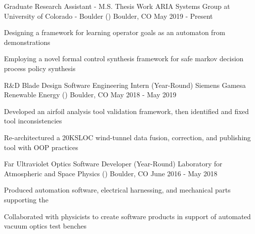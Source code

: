\begin{cventries}
  \cventry
    {Graduate Research Assistant - M.S. Thesis Work}
    {ARIA Systems Group at University of Colorado - Boulder ()}
    {Boulder, CO}
    {May 2019 - Present}
    {
      \begin{cvitems}
        \item {Designing a framework for learning operator goals as an automaton from demonstrations}
        \item {Employing a novel formal control synthesis framework for safe markov decision process policy synthesis}
      \end{cvitems}
    }
    \cventry
    {R\&D Blade Design Software Engineering Intern (Year-Round)}
    {Siemens Gamesa Renewable Energy ()}
    {Boulder, CO}
    {May 2018 - May 2019}
    {
      \begin{cvitems}
        \item {Developed an airfoil analysis tool validation framework, then identified and fixed tool inconsistencies}
        \item {Re-architectured a 20KSLOC wind-tunnel data fusion, correction, and publishing tool with OOP practices}
      \end{cvitems}
    }

  \cventry
    {Far Ultraviolet Optics Software Developer (Year-Round)}
    {Laboratory for Atmospheric and Space Physics () }
    {Boulder, CO}
    {June 2016 - May 2018}
    {
      \begin{cvitems}
        \item {Produced automation software, electrical harnessing, and mechanical parts supporting the }
        \item {Collaborated with physicists to create software products in support of automated vacuum optics test benches}
      \end{cvitems}
    }
\end{cventries}
